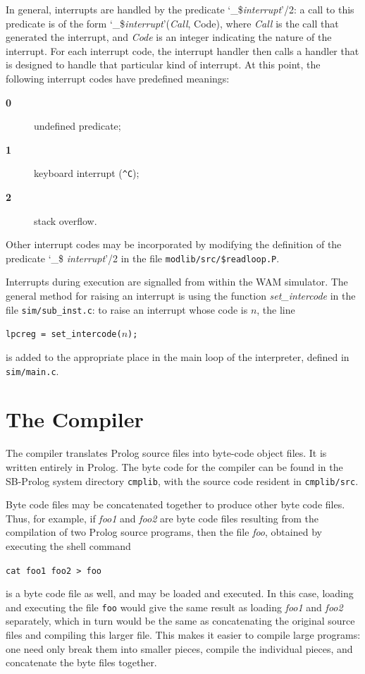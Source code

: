 In general, interrupts are handled by the predicate `\_\${\em interrupt}'/2:
a call to this predicate is of the form
`\_\${\em interrupt}'({\em Call}, Code),
where {\em Call} is the call that generated the interrupt,
and {\em Code} is an integer indicating the nature of the interrupt.
For each interrupt code, the interrupt handler then calls a handler that is
designed to handle that particular kind of interrupt.
At this point, the following interrupt codes have predefined meanings:
\begin{description}
\item[{\bf 0}] undefined predicate;
\item[{\bf 1}] keyboard interrupt (\verb|^C|);
\item[{\bf 2}] stack overflow.
\end{description}

Other interrupt codes may be incorporated by modifying the definition of
the predicate `\_\$ {\em interrupt}'/2
in the file {\tt modlib/src/\$readloop.P}.

Interrupts during execution are signalled from within the WAM simulator.
The general method for raising an interrupt is using the function
{\em set\_intercode} in the file {\tt sim/sub\_inst.c}: to raise an interrupt
whose code is $n$, the line
\begin{center}
{\tt lpcreg = set\_intercode($n$);}
\end{center}
is added to the appropriate place in the main loop of the interpreter,
defined in {\tt sim/main.c}.

\section{The Compiler}\label{the_compiler} 

The compiler translates Prolog source files into byte-code object files.
It is written entirely in Prolog.
The byte code for the compiler
can be found in the SB-Prolog system directory
{\tt cmplib},
with the source code resident in {\tt cmplib/src}.

Byte code files may be concatenated together to produce other byte code files.
Thus, for example, if {\em foo1} and {\em foo2} are byte code files resulting
from the compilation of two Prolog source programs,
then the file {\em foo},
obtained by executing the shell command
\begin{center}
{\tt cat foo1 foo2 > foo}
\end{center}
is a byte code file as well, and may be loaded and executed.
In this case, loading and executing the file {\tt foo}
would give the same result as loading {\em foo1} and {\em foo2} separately,
which in turn would be the same as
concatenating the original source files and compiling this larger file.
This makes it easier to compile large programs:
one need only break them into smaller pieces, compile the individual pieces,
and concatenate the byte files together.

